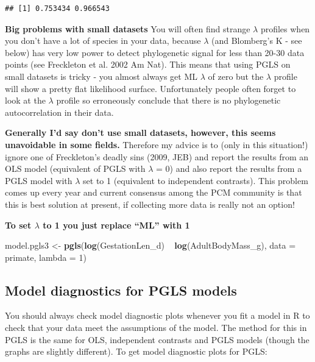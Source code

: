 \documentclass[]{book}
\newenvironment{Shaded}{\begin{snugshade}}{\end{snugshade}}
\newcommand{\KeywordTok}[1]{\textcolor[rgb]{0.13,0.29,0.53}{\textbf{{#1}}}}
\newcommand{\DataTypeTok}[1]{\textcolor[rgb]{0.13,0.29,0.53}{{#1}}}
\newcommand{\DecValTok}[1]{\textcolor[rgb]{0.00,0.00,0.81}{{#1}}}
\newcommand{\StringTok}[1]{\textcolor[rgb]{0.31,0.60,0.02}{{#1}}}
\newcommand{\NormalTok}[1]{{#1}}
\theoremstyle{definition}
\theoremstyle{definition}
\theoremstyle{definition}
\theoremstyle{remark}
\begin{document}
\begin{verbatim}
## [1] 0.753434 0.966543
\end{verbatim}

\textbf{Big problems with small datasets} You will often find strange
\(\lambda\) profiles when you don't have a lot of species in your data,
because \(\lambda\) (and Blomberg's K - see below) has very low power to
detect phylogenetic signal for less than 20-30 data points (see
Freckleton et al. 2002 Am Nat). This means that using PGLS on small
datasets is tricky - you almost always get ML \(\lambda\) of zero but
the \(\lambda\) profile will show a pretty flat likelihood surface.
Unfortunately people often forget to look at the \(\lambda\) profile so
erroneously conclude that there is no phylogenetic autocorrelation in
their data.

\textbf{Generally I'd say don't use small datasets, however, this seems
unavoidable in some fields.} Therefore my advice is to (only in this
situation!) ignore one of Freckleton's deadly sins (2009, JEB) and
report the results from an OLS model (equivalent of PGLS with
\(\lambda\) = 0) and also report the results from a PGLS model with
\(\lambda\) set to 1 (equivalent to independent contrasts). This problem
comes up every year and current consensus among the PCM community is
that this is best solution at present, if collecting more data is really
not an option!

\textbf{To set \(\lambda\) to 1 you just replace ``ML'' with 1}

\begin{Shaded}
\begin{Highlighting}[]
\NormalTok{model.pgls3 <-}\StringTok{ }\KeywordTok{pgls}\NormalTok{(}\KeywordTok{log}\NormalTok{(GestationLen_d) ~}\StringTok{ }\KeywordTok{log}\NormalTok{(AdultBodyMass_g), }
                    \DataTypeTok{data =} \NormalTok{primate, }\DataTypeTok{lambda =} \DecValTok{1}\NormalTok{)}
\end{Highlighting}
\end{Shaded}

\subsection{Model diagnostics for PGLS
models}\label{model-diagnostics-for-pgls-models}

You should always check model diagnostic plots whenever you fit a model
in R to check that your data meet the assumptions of the model. The
method for this in PGLS is the same for OLS, independent contrasts and
PGLS models (though the graphs are slightly different). To get model
diagnostic plots for PGLS:
\end{document}
